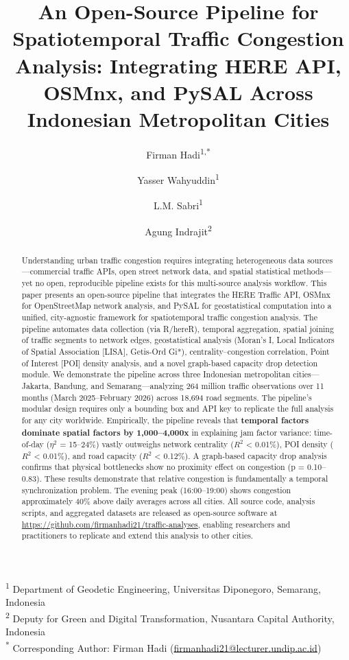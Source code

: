 \documentclass[12pt,a4paper]{article}
\title{An Open-Source Pipeline for Spatiotemporal Traffic Congestion Analysis: Integrating HERE API, OSMnx, and PySAL Across Indonesian Metropolitan Cities}
\author{%
  Firman Hadi\textsuperscript{1,*} \and
  Yasser Wahyuddin\textsuperscript{1} \and
  L.M. Sabri\textsuperscript{1} \and
  Agung Indrajit\textsuperscript{2}%
}
\date{}
\begin{document}
\maketitle

\noindent\textsuperscript{1} Department of Geodetic Engineering, Universitas Diponegoro, Semarang, Indonesia\\
\textsuperscript{2} Deputy for Green and Digital Transformation, Nusantara Capital Authority, Indonesia\\[6pt]
\textsuperscript{*} Corresponding Author: Firman Hadi (\href{mailto:firmanhadi21@lecturer.undip.ac.id}{firmanhadi21@lecturer.undip.ac.id})

\bigskip

\begin{abstract}
Understanding urban traffic congestion requires integrating heterogeneous data sources---commercial traffic APIs, open street network data, and spatial statistical methods---yet no open, reproducible pipeline exists for this multi-source analysis workflow. This paper presents an open-source pipeline that integrates the HERE Traffic API, OSMnx for OpenStreetMap network analysis, and PySAL for geostatistical computation into a unified, city-agnostic framework for spatiotemporal traffic congestion analysis. The pipeline automates data collection (via R/hereR), temporal aggregation, spatial joining of traffic segments to network edges, geostatistical analysis (Moran's I, Local Indicators of Spatial Association [LISA], Getis-Ord Gi*), centrality--congestion correlation, Point of Interest [POI] density analysis, and a novel graph-based capacity drop detection module. We demonstrate the pipeline across three Indonesian metropolitan cities---Jakarta, Bandung, and Semarang---analyzing 264 million traffic observations over 11 months (March 2025--February 2026) across 18,694 road segments. The pipeline's modular design requires only a bounding box and API key to replicate the full analysis for any city worldwide. Empirically, the pipeline reveals that \textbf{temporal factors dominate spatial factors by 1,000--4,000x} in explaining jam factor variance: time-of-day ($\eta^2$ = 15--24\%) vastly outweighs network centrality ($R^2$ < 0.01\%), POI density ($R^2$ < 0.01\%), and road capacity ($R^2$ < 0.12\%). A graph-based capacity drop analysis confirms that physical bottlenecks show no proximity effect on congestion (p = 0.10--0.83). These results demonstrate that relative congestion is fundamentally a temporal synchronization problem. The evening peak (16:00--19:00) shows congestion approximately 40\% above daily averages across all cities. All source code, analysis scripts, and aggregated datasets are released as open-source software at \url{https://github.com/firmanhadi21/traffic-analyses}, enabling researchers and practitioners to replicate and extend this analysis to other cities.
\end{abstract}
\end{document}
